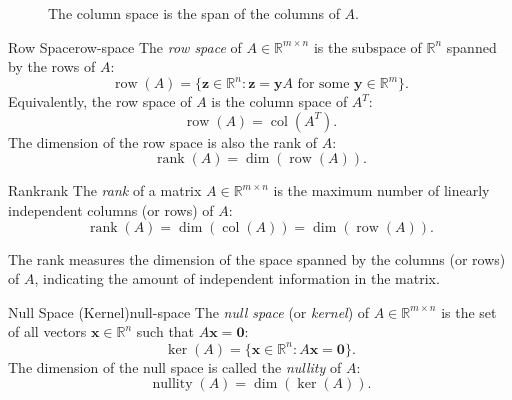 \begin{figure}[H]
    \centering
    \caption{The column space is the span of the columns of \(A\).}
\end{figure}

\begin{definition}{Row Space}{row-space}
    The \emph{row space} of \(A\in\mathbb{R}^{m\times n}\) is the subspace of \(\mathbb{R}^n\) spanned by the rows of \(A\):
    \[
        \operatorname{row}(A) = \{\mathbf{z} \in \mathbb{R}^n : \mathbf{z} = \mathbf{y}A \text{ for some } \mathbf{y} \in \mathbb{R}^m\}.
    \]
    Equivalently, the row space of \(A\) is the column space of \(A^T\):
    \[
        \operatorname{row}(A) = \operatorname{col}(A^T).
    \]
    The dimension of the row space is also the rank of \(A\):
    \[
        \operatorname{rank}(A) = \dim(\operatorname{row}(A)).
    \]
\end{definition}

\begin{definition}{Rank}{rank}
    The \emph{rank} of a matrix \(A\in\mathbb{R}^{m\times n}\) is the maximum number of linearly independent columns (or rows) of \(A\):
    \[
        \operatorname{rank}(A) = \dim(\operatorname{col}(A)) = \dim(\operatorname{row}(A)).
    \]
\end{definition}
The rank measures the dimension of the space spanned by the columns (or rows) of \(A\), indicating the amount of independent information in the matrix.

\begin{definition}{Null Space (Kernel)}{null-space}
    The \emph{null space} (or \emph{kernel}) of \(A\in\mathbb{R}^{m\times n}\) is the set of all vectors \(\mathbf{x}\in\mathbb{R}^n\) such that \(A\mathbf{x} = \mathbf{0}\):
    \[
        \ker(A) = \{\mathbf{x} \in \mathbb{R}^n : A\mathbf{x} = \mathbf{0}\}.
    \]
    The dimension of the null space is called the \emph{nullity} of \(A\):
    \[
        \operatorname{nullity}(A) = \dim(\ker(A)).
    \]
\end{definition}

